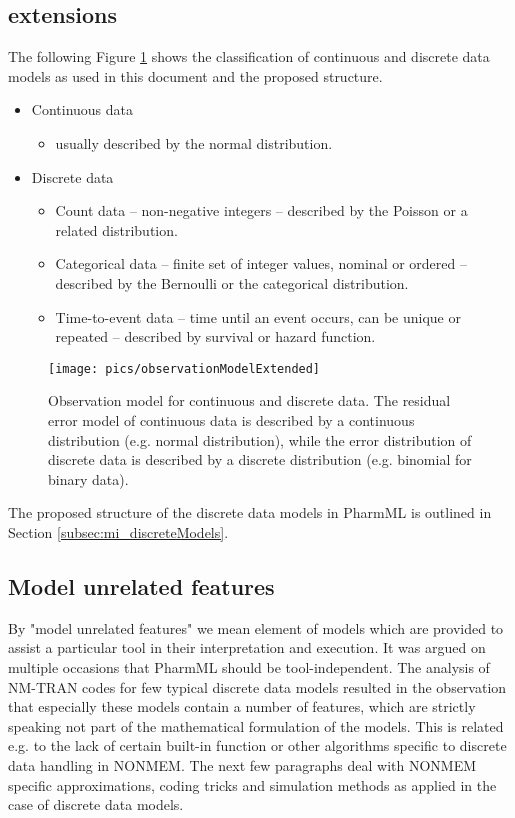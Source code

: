 \subsection{ extensions}
The following Figure \ref{fig:observationModel} shows the classification of continuous and discrete 
data models as used in this document and the proposed \pml structure. 
\begin{itemize}
\item
Continuous data
\begin{itemize}
\item
usually described by the normal distribution.
\end{itemize}
\item
Discrete data
\begin{itemize}
\item
Count data -- non-negative integers -- described by the Poisson or a related distribution.
\item
Categorical data -- finite set of integer values, nominal or ordered -- described by the Bernoulli
or the categorical distribution. 
\item
Time-to-event data -- time until an event occurs, can be unique or repeated -- described by 
survival or hazard function.
\end{itemize}
\end{itemize}
\begin{figure}[htb!]
\centering
 \texttt{[image: pics/observationModelExtended]}
\caption{Observation model for continuous and discrete data. The residual error model of continuous 
data is described by a continuous distribution (e.g. normal distribution), while the error distribution of 
discrete data is described by a discrete distribution (e.g. binomial for binary data).}
\label{fig:observationModel}
\end{figure}
The proposed structure of the discrete data models 
in PharmML is outlined in Section \ref{subsec:mi_discreteModels}.


\subsection{Model unrelated features}
By "model unrelated features" we mean element of models which are provided
to assist a particular tool in their interpretation and execution. It was argued on multiple 
occasions that PharmML should be tool-independent. The analysis of NM-TRAN codes 
for few typical discrete data models resulted in the observation that especially these 
models contain a number of features, which are strictly speaking not part of the 
mathematical formulation of the models. This is related e.g. to the lack of certain built-in 
function or other algorithms specific to discrete data handling in NONMEM. The next few paragraphs 
deal with NONMEM specific approximations, coding tricks and simulation methods as applied 
in the case of discrete data models.  


